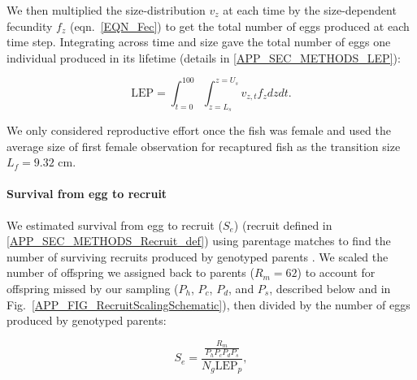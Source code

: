 \documentclass[12pt, oneside]{article}   	%
\begin{document}
We then multiplied the size-distribution $v_z$ at each time by the size-dependent fecundity $f_z$ (eqn.\ \ref{EQN_Fec}) to get the total number of eggs produced at each time step. Integrating across time and size gave the total number of eggs one individual produced in its lifetime (details in \ref{APP_SEC_METHODS_LEP}):

\begin{equation}
\text{LEP} = \int_{t=0}^{100}\int_{z=L_s}^{z=U_s} v_{z,t} f_z dz dt. \label{EQN_LEP}
\end{equation}

We only considered reproductive effort once the fish was female and used the average size of first female observation for recaptured fish as the transition size $L_f = 9.32$ cm. 

\paragraph*{Survival from egg to recruit}

We estimated survival from egg to recruit ($S_e$) (recruit defined in \ref{APP_SEC_METHODS_Recruit_def}) using parentage matches to find the number of surviving recruits produced by genotyped parents \citep[similar to][]{johnson2018integrating}. We scaled the number of offspring we assigned back to parents ($R_m = 62$) to account for offspring missed by our sampling ($P_h$, $P_c$, $P_d$, and $P_s$, described below and in Fig.\ \ref{APP_FIG_RecruitScalingSchematic}), then divided by the number of eggs produced by genotyped parents:

\begin{equation}
S_e = \frac{\frac{R_m}{P_h P_c P_d P_s}}{N_g \text{LEP}_p}, \label{EQN_EggRecruitSurv}
\end{equation}
\end{document}
